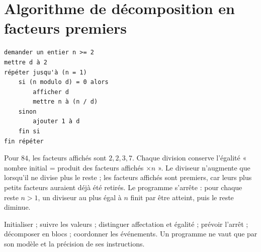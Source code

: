\documentclass[../cours_3e.tex]{subfiles}
\begin{document}
\section{Algorithme de décomposition en facteurs premiers}
\begin{lstlisting}
demander un entier n >= 2
mettre d à 2
répéter jusqu'à (n = 1)
    si (n modulo d) = 0 alors
        afficher d
        mettre n à (n / d)
    sinon
        ajouter 1 à d
    fin si
fin répéter
\end{lstlisting}
Pour $84$, les facteurs affichés sont $2,2,3,7$. Chaque division conserve l'égalité « nombre initial = produit des facteurs affichés $\times n$ ». Le diviseur n'augmente que lorsqu'il ne divise plus le reste ; les facteurs affichés sont premiers, car leurs plus petits facteurs auraient déjà été retirés.
Le programme s'arrête : pour chaque reste $n>1$, un diviseur au plus égal à $n$ finit par être atteint, puis le reste diminue.
\begin{retenir}
Initialiser ; suivre les valeurs ; distinguer affectation et égalité ; prévoir l'arrêt ; décomposer en blocs ; coordonner les événements. Un programme ne vaut que par son modèle et la précision de ses instructions.
\end{retenir}
\end{document}
